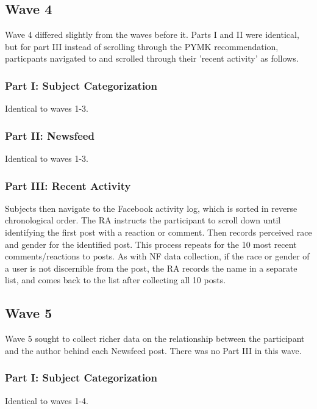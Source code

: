 \documentclass[12pt,letterpaper]{article}
\begin{document}
\subsection{Wave 4}

Wave 4 differed slightly from the waves before it. Parts I and II were identical, but for part III instead of scrolling through the PYMK recommendation, particpants navigated to and scrolled through their 'recent activity' as follows.

\subsubsection{Part I: Subject Categorization} Identical to waves 1-3.

\subsubsection{Part II: Newsfeed} Identical to waves 1-3.

\subsubsection{Part III: Recent Activity} Subjects then navigate to the Facebook activity log, which is sorted in reverse chronological order. The RA instructs the participant to scroll down until identifying the first post with a reaction or comment. Then records perceived race and gender for the identified post. This process repeats for the 10 most recent comments/reactions to posts. As with NF data collection, if the race or gender of a user is not discernible from the post, the RA records the name in a separate list, and comes back to the list after collecting all 10 posts.

\subsection{Wave 5}

Wave 5 sought to collect richer data on the relationship between the participant and the author behind each Newsfeed post. There was no Part III in this wave.

\subsubsection{Part I: Subject Categorization} Identical to waves 1-4.
\end{document}
